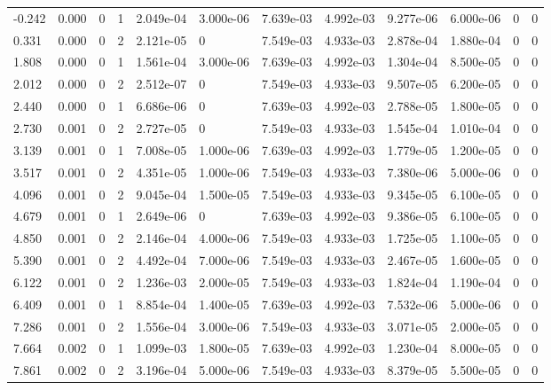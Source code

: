 \documentclass[preview]{standalone}
\begin{document}
{{\begin{tabular}{L{1.2cm}C{1.2cm} C{0.3cm}C{0.5cm} C{1.4cm}C{1.4cm} C{1.4cm}C{1.4cm} C{1.6cm}C{1.6cm} C{1.6cm}C{1.6cm}}
  -0.242  &  0.000  & 0     &  1 &  2.049e-04  & 3.000e-06  &  7.639e-03&   4.992e-03& 9.277e-06 & 6.000e-06   &  0 & 0  \\ 
  0.331  &  0.000  & 0     &  2 &  2.121e-05  & 0  &  7.549e-03&   4.933e-03& 2.878e-04 & 1.880e-04   &  0 & 0  \\ 
  1.808  &  0.000  & 0     &  1 &  1.561e-04  & 3.000e-06  &  7.639e-03&   4.992e-03& 1.304e-04 & 8.500e-05   &  0 & 0  \\ 
  2.012  &  0.000  & 0     &  2 &  2.512e-07  & 0  &  7.549e-03&   4.933e-03& 9.507e-05 & 6.200e-05   &  0 & 0  \\ 
  2.440  &  0.000  & 0     &  1 &  6.686e-06  & 0  &  7.639e-03&   4.992e-03& 2.788e-05 & 1.800e-05   &  0 & 0  \\ 
  2.730  &  0.001  & 0     &  2 &  2.727e-05  & 0  &  7.549e-03&   4.933e-03& 1.545e-04 & 1.010e-04   &  0 & 0  \\ 
  3.139  &  0.001  & 0     &  1 &  7.008e-05  & 1.000e-06  &  7.639e-03&   4.992e-03& 1.779e-05 & 1.200e-05   &  0 & 0  \\ 
  3.517  &  0.001  & 0     &  2 &  4.351e-05  & 1.000e-06  &  7.549e-03&   4.933e-03& 7.380e-06 & 5.000e-06   &  0 & 0  \\ 
  4.096  &  0.001  & 0     &  2 &  9.045e-04  & 1.500e-05  &  7.549e-03&   4.933e-03& 9.345e-05 & 6.100e-05   &  0 & 0  \\ 
  4.679  &  0.001  & 0     &  1 &  2.649e-06  & 0  &  7.639e-03&   4.992e-03& 9.386e-05 & 6.100e-05   &  0 & 0  \\ 
  4.850  &  0.001  & 0     &  2 &  2.146e-04  & 4.000e-06  &  7.549e-03&   4.933e-03& 1.725e-05 & 1.100e-05   &  0 & 0  \\ 
  5.390  &  0.001  & 0     &  2 &  4.492e-04  & 7.000e-06  &  7.549e-03&   4.933e-03& 2.467e-05 & 1.600e-05   &  0 & 0  \\ 
  6.122  &  0.001  & 0     &  2 &  1.236e-03  & 2.000e-05  &  7.549e-03&   4.933e-03& 1.824e-04 & 1.190e-04   &  0 & 0  \\ 
  6.409  &  0.001  & 0     &  1 &  8.854e-04  & 1.400e-05  &  7.639e-03&   4.992e-03& 7.532e-06 & 5.000e-06   &  0 & 0  \\ 
  7.286  &  0.001  & 0     &  2 &  1.556e-04  & 3.000e-06  &  7.549e-03&   4.933e-03& 3.071e-05 & 2.000e-05   &  0 & 0  \\ 
  7.664  &  0.002  & 0     &  1 &  1.099e-03  & 1.800e-05  &  7.639e-03&   4.992e-03& 1.230e-04 & 8.000e-05   &  0 & 0  \\ 
  7.861  &  0.002  & 0     &  2 &  3.196e-04  & 5.000e-06  &  7.549e-03&   4.933e-03& 8.379e-05 & 5.500e-05   &  0 & 0  \\ 

\end{tabular}}}
\end{document}
